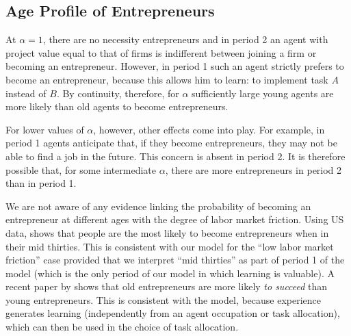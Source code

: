 \documentclass[12pt,american]{paper}
\theoremstyle{remark}
\begin{document}
\subsection{Age Profile of Entrepreneurs}
At $\alpha=1$, there are no necessity entrepreneurs and in period 2 an agent with project value equal to that of firms is indifferent between joining a firm or becoming an entrepreneur. However, in period 1 such an agent strictly prefers to become an entrepreneur, because this allows him to learn: to implement task $A$ instead of $B$. 
By continuity, therefore, for $\alpha$ sufficiently large young agents are more likely than old agents to become entrepreneurs.


%
For lower values of $\alpha$, however,  other effects come into play. %
For example, in period 1 agents anticipate that, if they become entrepreneurs, they may not be able to find a job in the future. This concern is absent in period 2. It is therefore possible that, for some intermediate $\alpha$, there are more entrepreneurs in period 2 than in period 1. 

We are not aware of any evidence linking  the probability of becoming an entrepreneur at different ages with the degree of labor market friction. Using US data, \cite{Hincapie2020} shows that people are the most likely to become entrepreneurs when in their mid thirties.  This is consistent with our model for the ``low labor market friction'' case provided that we interpret ``mid thirties'' as part of  period 1 of the model (which is the only period of our model in which learning is valuable).
A  recent  paper by \cite*{Azoulay2020} shows that old entrepreneurs are more likely \textit{to succeed} than young entrepreneurs. This is consistent with the model, because experience generates learning (independently from an agent occupation or task allocation), which can then be used in the choice of task allocation.
\end{document}
